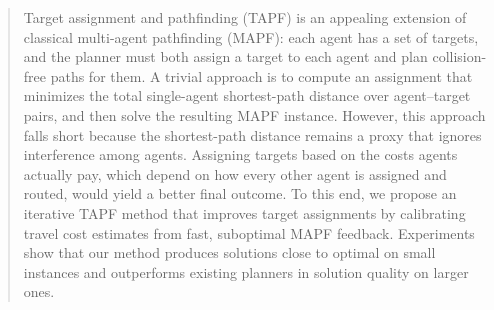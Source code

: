 \begin{abstract}
Target assignment and pathfinding (TAPF) is an appealing extension of classical multi-agent pathfinding (MAPF): each agent has a set of targets, and the planner must both assign a target to each agent and plan collision-free paths for them.
A trivial approach is to compute an assignment that minimizes the total single-agent shortest-path distance over agent--target pairs, and then solve the resulting MAPF instance.
However, this approach falls short because the shortest-path distance remains a proxy that ignores interference among agents.
Assigning targets based on the costs agents actually pay, which depend on how every other agent is assigned and routed, would yield a better final outcome.
To this end, we propose an iterative TAPF method that improves target assignments by calibrating travel cost estimates from fast, suboptimal MAPF feedback.
Experiments show that our method produces solutions close to optimal on small instances and outperforms existing planners in solution quality on larger ones.
\end{abstract}